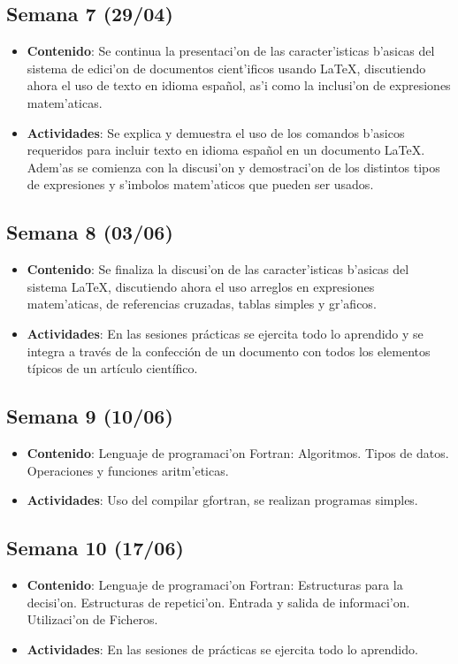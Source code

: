 \documentclass[letterpaper,11pt]{exam}
\begin{document}
\begin{multicols}{2}
\begin{scriptsize}
\subsection*{Semana 7 (29/04)}
\begin{itemize}
\item \textbf{Contenido}: Se continua la presentaci'on de las caracter'isticas b'asicas del sistema de edici'on de documentos cient'ificos usando \LaTeX, discutiendo ahora el uso de texto en idioma espa\~nol, as'i como la inclusi'on de expresiones matem'aticas.
\item \textbf{Actividades}: Se explica y demuestra el uso de los comandos b'asicos requeridos para incluir texto en idioma espa\~nol en un documento \LaTeX. Adem'as se comienza con la discusi'on y demostraci'on de los distintos tipos de expresiones y s'imbolos matem'aticos que pueden ser usados.
\end{itemize}

\subsection*{Semana 8 (03/06)}
\begin{itemize}
\item \textbf{Contenido}: Se finaliza la discusi'on de las caracter'isticas b'asicas del sistema \LaTeX, discutiendo ahora el uso arreglos en expresiones matem'aticas, de referencias cruzadas, tablas simples y gr'aficos.
\item \textbf{Actividades}: En las sesiones prácticas se ejercita todo lo aprendido y se integra a través de la confección de un documento con todos los elementos típicos de un artículo científico.
\end{itemize}


\subsection*{Semana 9 (10/06)}
\begin{itemize}
\item \textbf{Contenido}: Lenguaje de programaci'on Fortran: Algoritmos. Tipos de datos. Operaciones y funciones aritm'eticas. 
\item \textbf{Actividades}: Uso del compilar gfortran, se realizan programas simples.
\end{itemize}


\subsection*{Semana 10 (17/06)}
\begin{itemize}
\item \textbf{Contenido}: Lenguaje de programaci'on Fortran: Estructuras para la decisi'on. Estructuras de repetici'on. Entrada y salida de informaci'on. Utilizaci'on de Ficheros.
\item \textbf{Actividades}: En las sesiones de prácticas se ejercita todo lo aprendido.
\end{itemize}



\end{scriptsize}
\end{multicols}
\end{document}
